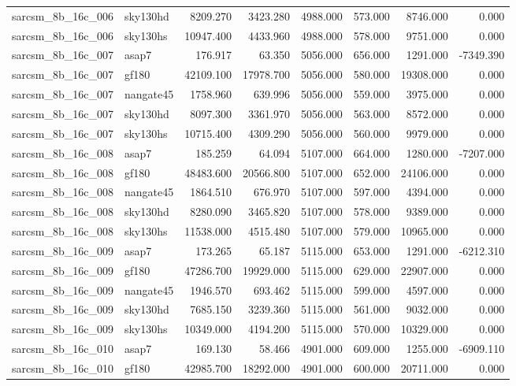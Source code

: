 \begin{tabular}{llrrrrrr}
sarcsm\_8b\_16c\_006 & sky130hd & 8209.270 & 3423.280 & 4988.000 & 573.000 & 8746.000 & 0.000 \\
sarcsm\_8b\_16c\_006 & sky130hs & 10947.400 & 4433.960 & 4988.000 & 578.000 & 9751.000 & 0.000 \\
sarcsm\_8b\_16c\_007 & asap7 & 176.917 & 63.350 & 5056.000 & 656.000 & 1291.000 & -7349.390 \\
sarcsm\_8b\_16c\_007 & gf180 & 42109.100 & 17978.700 & 5056.000 & 580.000 & 19308.000 & 0.000 \\
sarcsm\_8b\_16c\_007 & nangate45 & 1758.960 & 639.996 & 5056.000 & 559.000 & 3975.000 & 0.000 \\
sarcsm\_8b\_16c\_007 & sky130hd & 8097.300 & 3361.970 & 5056.000 & 563.000 & 8572.000 & 0.000 \\
sarcsm\_8b\_16c\_007 & sky130hs & 10715.400 & 4309.290 & 5056.000 & 560.000 & 9979.000 & 0.000 \\
sarcsm\_8b\_16c\_008 & asap7 & 185.259 & 64.094 & 5107.000 & 664.000 & 1280.000 & -7207.000 \\
sarcsm\_8b\_16c\_008 & gf180 & 48483.600 & 20566.800 & 5107.000 & 652.000 & 24106.000 & 0.000 \\
sarcsm\_8b\_16c\_008 & nangate45 & 1864.510 & 676.970 & 5107.000 & 597.000 & 4394.000 & 0.000 \\
sarcsm\_8b\_16c\_008 & sky130hd & 8280.090 & 3465.820 & 5107.000 & 578.000 & 9389.000 & 0.000 \\
sarcsm\_8b\_16c\_008 & sky130hs & 11538.000 & 4515.480 & 5107.000 & 579.000 & 10965.000 & 0.000 \\
sarcsm\_8b\_16c\_009 & asap7 & 173.265 & 65.187 & 5115.000 & 653.000 & 1291.000 & -6212.310 \\
sarcsm\_8b\_16c\_009 & gf180 & 47286.700 & 19929.000 & 5115.000 & 629.000 & 22907.000 & 0.000 \\
sarcsm\_8b\_16c\_009 & nangate45 & 1946.570 & 693.462 & 5115.000 & 599.000 & 4597.000 & 0.000 \\
sarcsm\_8b\_16c\_009 & sky130hd & 7685.150 & 3239.360 & 5115.000 & 561.000 & 9032.000 & 0.000 \\
sarcsm\_8b\_16c\_009 & sky130hs & 10349.000 & 4194.200 & 5115.000 & 570.000 & 10329.000 & 0.000 \\
sarcsm\_8b\_16c\_010 & asap7 & 169.130 & 58.466 & 4901.000 & 609.000 & 1255.000 & -6909.110 \\
sarcsm\_8b\_16c\_010 & gf180 & 42985.700 & 18292.000 & 4901.000 & 600.000 & 20711.000 & 0.000 \\

\end{tabular}
